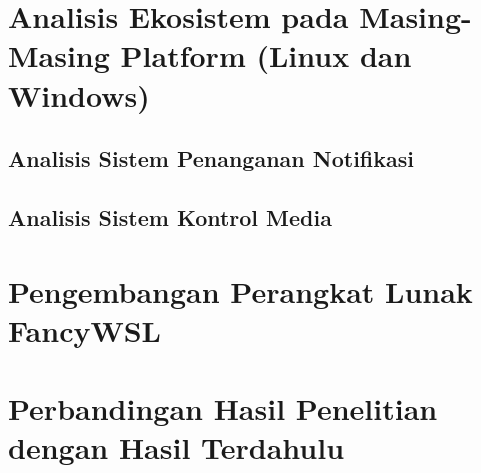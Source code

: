 \section{Analisis Ekosistem pada Masing-Masing Platform (Linux dan Windows)}

\subsection{Analisis Sistem Penanganan Notifikasi}

\subsection{Analisis Sistem Kontrol Media}

\section{Pengembangan Perangkat Lunak FancyWSL}

\section{Perbandingan Hasil Penelitian dengan Hasil Terdahulu}
